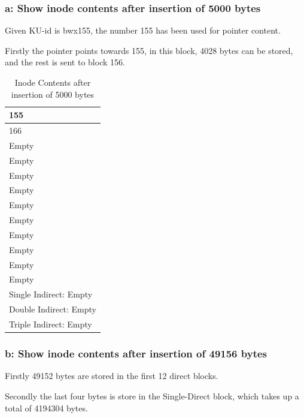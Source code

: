 \documentclass[11pt,a4paper]{article}
\theoremstyle{plain}
\theoremstyle{definition}
\theoremstyle{remark}
\numberwithin{equation}{section}
\begin{document}
\subsubsection*{a: Show inode contents after insertion of 5000 bytes}
Given KU-id is bwx155, the number 155 has been used for pointer content.

Firstly the pointer points towards 155, in this block, 4028 bytes can be stored, and the rest is sent to block 156.

\begin{table}[]
    \centering
    \caption{Inode Contents after insertion of 5000 bytes}
    \label{my-label}
    \begin{tabular}{|l|}
        \hline
        155                    \\ \hline
        166                    \\ \hline
        Empty                  \\ \hline
        Empty                  \\ \hline
        Empty                  \\ \hline
        Empty                  \\ \hline
        Empty                  \\ \hline
        Empty                  \\ \hline
        Empty                  \\ \hline
        Empty                  \\ \hline
        Empty                  \\ \hline
        Empty                  \\ \hline
        Single Indirect: Empty \\ \hline
        Double Indirect: Empty \\ \hline
        Triple Indirect: Empty \\ \hline
    \end{tabular}
\end{table}

\subsubsection*{b: Show inode contents after insertion of 49156 bytes}
Firstly 49152 bytes are stored in the first 12 direct blocks.

Secondly the last four bytes is store in the Single-Direct block, which takes up a total of 4194304 bytes.
\end{document}
